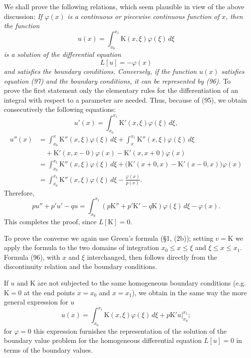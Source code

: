 We shall prove the following relations, which seem plausible in view of the above discussion: \emph{If $\varphi(x)$ is a continuous or piecewise continuous function of $x$, then the function}
\begin{equation}
u(x)=\int_{x_0}^{x_1}\mathrm K(x,\xi)\varphi(\xi)\,d\xi
\tag{96}
\end{equation}
\emph{is a solution of the differential equation}
\begin{equation}
L[u]=-\varphi(x)
\tag{97}
\end{equation}
\emph{and satisfies the boundary conditions. Conversely, if the function $u(x)$ satisfies equation (97) and the boundary conditions, it can be represented by (96).} To prove the first statement only the elementary rules for the differentiation of an integral with respect to a parameter are needed. Thus, because of (95), we obtain consecutively the following equations:
\[
u'(x)=\int_{x_0}^{x_1}\mathrm K'(x,\xi)\varphi(\xi)\,d\xi,
\]
\[
\begin{aligned}
u''(x)
&=\int_{x_0}^{x}\mathrm K''(x,\xi)\varphi(\xi)\,d\xi
 +\int_x^{x_1}\mathrm K''(x,\xi)\varphi(\xi)\,d\xi\\
&\quad+\mathrm K'(x,x-0)\varphi(x)-\mathrm K'(x,x+0)\varphi(x)\\
&=\int_{x_0}^{x_1}\mathrm K''(x,\xi)\varphi(\xi)\,d\xi
 +\bigl(\mathrm K'(x+0,x)-\mathrm K'(x-0,x)\bigr)\varphi(x)\\
&=\int_{x_0}^{x_1}\mathrm K''(x,\xi)\varphi(\xi)\,d\xi-\frac{\varphi(x)}{p(x)}.
\end{aligned}
\]
Therefore,
\[
pu''+p'u'-qu
=\int_{x_0}^{x_1}(p\mathrm K''+p'\mathrm K'-q\mathrm K)\varphi(\xi)\,d\xi-\varphi(x).
\]
This completes the proof, since $L[\mathrm K]=0$.

To prove the converse we again use Green's formula (\S1, (2b)); setting $v=\mathrm K$ we apply the formula to the two domains of integration $x_0\le x\le\xi$ and $\xi\le x\le x_1$. Formula (96), with $x$ and $\xi$ interchanged, then follows directly from the discontinuity relation and the boundary conditions.

If $u$ and $\mathrm K$ are not subjected to the same homogeneous boundary conditions (e.g. $\mathrm K=0$ at the end points $x=x_0$ and $x=x_1$), we obtain in the same way the more general expression for $u$
\[
u(x)=\int_{x_0}^{x_1}\mathrm K(x,\xi)\varphi(\xi)\,d\xi+
\left.p\mathrm K'u\right|_{x_0}^{x_1};
\]
for $\varphi=0$ this expression furnishes the representation of the solution of the boundary value problem for the homogeneous differential equation $L[u]=0$ in terms of the boundary values.

